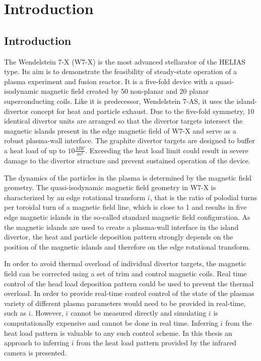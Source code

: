 %
\chapter{Introduction}
\label{sec:intro}

\section{Introduction}
The Wendelstein 7-X (W7-X) is the most advanced stellarator of the HELIAS type. Its aim is to demonstrate the feasibility of steady-state operation of a plasma experiment and fusion reactor. It is a five-fold device with a quasi-isodynamic magnetic field created by 50 non-planar and 20 planar superconducting coils. Like it is predecessor, Wendelstein 7-AS, it uses the island-divertor concept for heat and particle exhaust. Due to the five-fold symmetry, 10 identical divertor units are arranged so that the divertor targets intersect the magnetic islands present in the edge magnetic field of W7-X and serve as a robust plasma-wall interface. The graphite divertor targets are designed to buffer a heat load of up to $10 \frac{MW}{m^2}$. Exceeding the heat load limit could result in severe damage to the divertor structure and prevent sustained operation of the device.

The dynamics of the particles in the plasma is determined by the magnetic field geometry. The quasi-isodynamic magnetic field geometry in W7-X is characterized by an edge rotational transform $\bar{\iota}$, that is the ratio of polodial turns per toroidal turn of a magnetic field line, which is close to 1 and results in five edge magnetic islands in the so-called standard magnetic field configuration. As the magnetic islands are used to create a plasma-wall interface in the island divertor, the heat and particle deposition pattern strongly depends on the position of the magnetic islands and therefore on the edge rotational transform.

In order to avoid thermal overload of individual divertor targets, the magnetic field can be corrected using a set of trim and control magnetic coils. Real time control of the head load deposition pattern could be used to prevent the thermal overload. In order to provide real-time control control of the state of the plasmas variety of different plasma parameters would need to be provided in real-time, such as $\bar{\iota}$. However, $\bar{\iota}$ cannot be measured directly and simulating $\bar{\iota}$ is computationally expensive and cannot be done in real time. Inferring $\bar{\iota}$ from the heat load pattern is valuable to any such control scheme. In this thesis an approach to inferring $\bar{\iota}$ from the heat load pattern provided by the infrared camera is presented.

